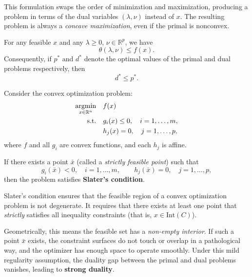 \documentclass[../main]{subfiles}
\begin{document}
This formulation swaps the order of minimization and maximization,
producing a problem in terms of the dual variables $(\lambda, \nu)$ instead of $x$.
The resulting problem is always a \emph{concave maximization}, even if the primal is nonconvex.
\begin{theorem}
For any feasible $x$ and any $\lambda \ge 0$, $\nu \in \mathbb{R}^p$, we have
\begin{equation}
\theta(\lambda, \nu) \le f(x).
\end{equation}
Consequently, if $p^*$ and $d^*$ denote the optimal values of the primal and dual problems respectively,
then
\begin{equation}
d^* \le p^*.
\end{equation}
\end{theorem}
\begin{proposition}
    Consider the convex optimization problem:
    \begin{equation}
        \begin{aligned}
            \mathop{\mathrm{argmin}}_{x \in \mathbb{R}^n} \quad & f(x) \\
            \text{s.t.} \quad & g_i(x) \le 0, \quad i = 1, \ldots, m, \\
            & h_j(x) = 0, \quad j = 1, \ldots, p,
        \end{aligned}
    \end{equation}
    where $f$ and all $g_i$ are convex functions, and each $h_j$ is affine.

    If there exists a point $\bar{x}$ (called a \emph{strictly feasible point}) such that
    \begin{equation}
        g_i(\bar{x}) < 0, \quad i = 1, \ldots, m,
        \qquad
        h_j(\bar{x}) = 0, \quad j = 1, \ldots, p,
    \end{equation}
    then the problem satisfies \textbf{Slater’s condition}.
\end{proposition}
Slater’s condition ensures that the feasible region of a convex optimization problem is not degenerate.  
It requires that there exists at least one point that \emph{strictly} satisfies all inequality constraints (that is, $x\in\mathrm{Int}(C)$).  

Geometrically, this means the feasible set has a \emph{non-empty interior}.  
If such a point $\bar{x}$ exists, the constraint surfaces do not touch or overlap in a pathological way, and the optimizer has enough space to operate smoothly.  
Under this mild regularity assumption, the duality gap between the primal and dual problems vanishes, leading to \textbf{strong duality}.
\end{document}
